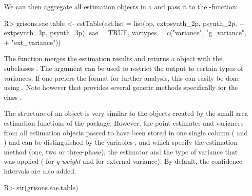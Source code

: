\documentclass[article]{jss}
\begin{document}
We can then aggregate all estimation objects in a  and pass it to the -function:


\begin{Schunk}
\begin{Sinput}
R> grisons.sae.table <- estTable(est.list = list(op, extpsynth_2p, psynth_2p,
+    extpsynth_3p, psynth_3p), sae = TRUE, vartypes = c("variance", "g_variance", 
+    "ext_variance"))
\end{Sinput}
\end{Schunk}


The function merges the estimation results and returns a  object with the subclasses . The  argument can be used to restrict the  output to certain types of variances. If one prefers the  format for further analysis, this can easily be done using . Note however that  provides several  generic methods specifically for the class .

The structure of an  object is very similar to the objects created by the small area estimation functions of the package. However, the point estimates and variances from all estimation objects passed to  have been stored in one single column ( and ) and can be distinguished by the variables ,  and  which specify the estimation method (one, two or three-phase), the estimator and the type of variance that was applied ( for \textit{g-weight} and  for external variance). By default, the confidence intervals are also added.


\begin{Schunk}
\begin{Sinput}
R> str(grisons.sae.table)
\end{Sinput}
\end{Schunk}
\end{document}
